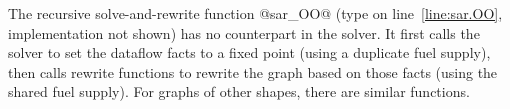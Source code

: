 \documentclass[blockstyle,preprint,natbib,nocopyrightspace]{sigplanconf}
\newcommand\lineref[1]{line~\ref{line:#1}}
\begin{document}
The recursive solve-and-rewrite function @sar_OO@ (type on
\lineref{sar.OO}, implementation not shown) 
has no counterpart in the solver.
It first calls the solver to set the dataflow facts to a fixed
point (using a duplicate fuel supply), then calls rewrite functions to
rewrite the graph based on 
those facts (using the shared fuel supply). 
For graphs of other shapes,
there are similar functions.





\end{document}
